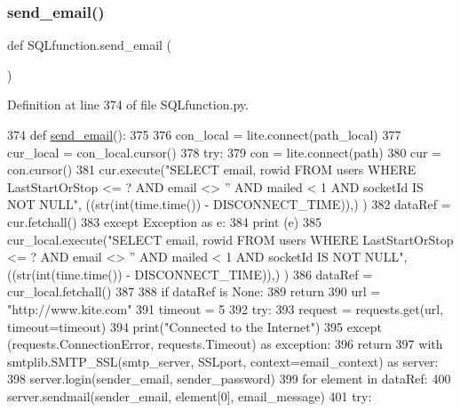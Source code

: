 \subsubsection{\texorpdfstring{send\+\_\+email()}{send\_email()}}
{\footnotesize\ttfamily def S\+Q\+Lfunction.\+send\+\_\+email (\begin{DoxyParamCaption}{ }\end{DoxyParamCaption})}



Definition at line 374 of file S\+Q\+Lfunction.\+py.


\begin{DoxyCode}
374 \textcolor{keyword}{def }\hyperlink{namespace_s_q_lfunction_a526fa5bc764d15233b0cc1880fc33f83}{send\_email}():
375     
376     con\_local = lite.connect(path\_local)
377     cur\_local = con\_local.cursor()
378     \textcolor{keywordflow}{try}:
379         con = lite.connect(path)
380         cur = con.cursor()
381         cur.execute(\textcolor{stringliteral}{"SELECT email, rowid FROM users WHERE LastStartOrStop <= ? AND email <> '' AND mailed <
       1 AND socketId IS NOT NULL"}, ((str(int(time.time()) - DISCONNECT\_TIME)),) )
382         dataRef = cur.fetchall()
383     \textcolor{keywordflow}{except} Exception \textcolor{keyword}{as} e:
384         \textcolor{keywordflow}{print} (e)        
385         cur\_local.execute(\textcolor{stringliteral}{"SELECT email, rowid FROM users WHERE LastStartOrStop <= ? AND email <> '' AND
       mailed < 1 AND socketId IS NOT NULL"}, ((str(int(time.time()) - DISCONNECT\_TIME)),) )
386         dataRef = cur\_local.fetchall()
387         
388     \textcolor{keywordflow}{if} dataRef \textcolor{keywordflow}{is} \textcolor{keywordtype}{None}:
389         \textcolor{keywordflow}{return}
390     url = \textcolor{stringliteral}{"http://www.kite.com"}
391     timeout = 5
392     \textcolor{keywordflow}{try}:
393         request = requests.get(url, timeout=timeout)
394         print(\textcolor{stringliteral}{"Connected to the Internet"})
395     \textcolor{keywordflow}{except} (requests.ConnectionError, requests.Timeout) \textcolor{keyword}{as} exception:
396         \textcolor{keywordflow}{return}
397     with smtplib.SMTP\_SSL(smtp\_server, SSLport, context=email\_context) \textcolor{keyword}{as} server:
398         server.login(sender\_email, sender\_password)
399         \textcolor{keywordflow}{for} element \textcolor{keywordflow}{in} dataRef:            
400             server.sendmail(sender\_email, element[0], email\_message)
401             \textcolor{keywordflow}{try}:

\end{DoxyCode}
